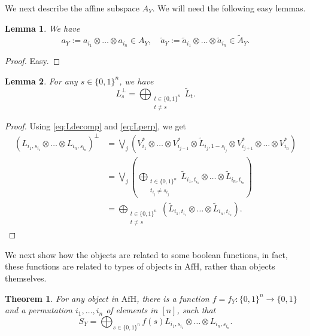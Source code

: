 \documentclass[12pt]{article}
\newtheorem{lemma}{Lemma}
\newtheorem{theorem}{Theorem}
\theoremstyle{definition}
\theoremstyle{remark}
\def \Afh{\mathrm{AfH}}
\begin{document}
We next describe the affine subspace $A_Y$. We will need the following easy lemmas.

\begin{lemma}\label{lemma:La} We have
\[
a_Y:=a_{i_1}\otimes \dots \otimes a_{i_n}\in A_Y,\quad \tilde a_Y:=\tilde a_{i_1}\otimes
\dots \otimes \tilde a_{i_n}\in \tilde A_Y.
\]

\end{lemma}

\begin{proof} Easy.

\end{proof}



\begin{lemma}\label{lemma:Lperp}   For any $s\in \{0,1\}^n$, we have 
\[
L_s^\perp=
\bigoplus_{\substack{t\in\{0,1\}^n\\ t\ne s}} \tilde L_t.
\]


\end{lemma}

\begin{proof} Using
\eqref{eq:Ldecomp} and \eqref{eq:Lperp}, we get
\begin{align*}
\left(L_{i_1,s_{i_1}}\otimes \dots\otimes L_{i_n,s_{i_n}}\right)^\perp&= \bigvee_j\left(
V_{i_1}^*\otimes
\dots \otimes V_{i_{j-1}}^*\otimes \tilde L_{i_j,1-s_{i_j}}\otimes V_{i_{j+1}}^*\otimes\dots \otimes
V_{i_n}^*\right)\\
&= \bigvee_j \left( \bigoplus_{\substack{t\in \{0,1\}^n\\ t_{i_j}\ne s_{i_j}}} \tilde
L_{i_1,t_{i_1}}\otimes\dots \otimes \tilde
L_{i_n,t_{i_n}}\right)\\
&= \bigoplus_{\substack{t\in \{0,1\}^n\\ t\ne s}} \left( \tilde L_{i_1,t_{i_1}}\otimes\dots \otimes \tilde
L_{i_n,t_{i_n}}\right).
\end{align*}


\end{proof}

We next show how the objects are related to some boolean functions, in fact, these
functions are related to types of objects in $\Afh$, rather than objects themselves.

\begin{theorem}\label{thm:boolean}
For any object in $\Afh$, there is a function $f=f_Y:\{0,1\}^n\to \{0,1\}$ 
and a permutation $i_1,\dots,i_n$ of elements in $[n]$,  
such that 
\[
S_Y=\bigoplus_{s\in \{0,1\}^n} f(s) L_{i_1,s_{i_1}}\otimes\dots\otimes
L_{i_n,s_{i_n}}.
\]


\end{theorem}
\end{document}
